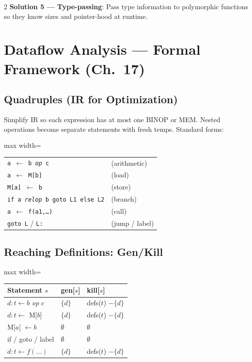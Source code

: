 \documentclass[9pt,landscape]{extarticle}
\begin{document}
\begin{multicols}{2}
\textbf{Solution 5 --- Type-passing}: Pass type information to polymorphic functions so they know sizes and pointer-hood at runtime.

\section{Dataflow Analysis --- Formal Framework (Ch.~17)}

\subsection{Quadruples (IR for Optimization)}

Simplify IR so each expression has at most one BINOP or MEM. Nested operations become separate statements with fresh temps. Standard forms:

\begin{adjustbox}{max width=\columnwidth}
\begin{tabular}{@{}ll@{}}
\texttt{a $\leftarrow$ b \textit{op} c} & (arithmetic) \\
\texttt{a $\leftarrow$ M[b]} & (load) \\
\texttt{M[a] $\leftarrow$ b} & (store) \\
\texttt{if a \textit{relop} b goto L1 else L2} & (branch) \\
\texttt{a $\leftarrow$ f(a1,\ldots)} & (call) \\
\texttt{goto L} / \texttt{L:} & (jump / label) \\
\end{tabular}
\end{adjustbox}

\subsection{Reaching Definitions: Gen/Kill}

\begin{adjustbox}{max width=\columnwidth}
\begin{tabular}{@{}lll@{}}
\textbf{Statement $s$} & \textbf{gen[$s$]} & \textbf{kill[$s$]} \\
\hline
$d: t \leftarrow b$ \textit{op} $c$ & $\{d\}$ & defs($t$) $- \{d\}$ \\
$d: t \leftarrow$ M[$b$] & $\{d\}$ & defs($t$) $- \{d\}$ \\
M[$a$] $\leftarrow b$ & $\emptyset$ & $\emptyset$ \\
if / goto / label & $\emptyset$ & $\emptyset$ \\
$d: t \leftarrow f(\ldots)$ & $\{d\}$ & defs($t$) $- \{d\}$ \\
\end{tabular}
\end{adjustbox}


\end{multicols}
\end{document}
